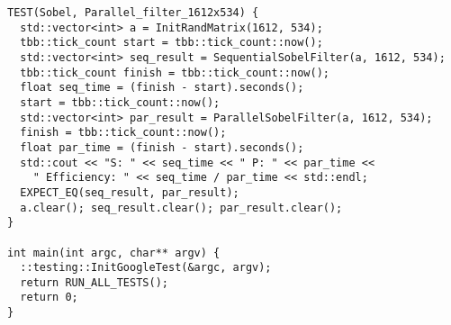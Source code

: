 \documentclass[12pt]{article}
\begin{document}
\begin{lstlisting}
TEST(Sobel, Parallel_filter_1612x534) {
  std::vector<int> a = InitRandMatrix(1612, 534);
  tbb::tick_count start = tbb::tick_count::now();
  std::vector<int> seq_result = SequentialSobelFilter(a, 1612, 534);
  tbb::tick_count finish = tbb::tick_count::now();
  float seq_time = (finish - start).seconds();
  start = tbb::tick_count::now();
  std::vector<int> par_result = ParallelSobelFilter(a, 1612, 534);
  finish = tbb::tick_count::now();
  float par_time = (finish - start).seconds();
  std::cout << "S: " << seq_time << " P: " << par_time <<
    " Efficiency: " << seq_time / par_time << std::endl;
  EXPECT_EQ(seq_result, par_result);
  a.clear(); seq_result.clear(); par_result.clear();
}

int main(int argc, char** argv) {
  ::testing::InitGoogleTest(&argc, argv);
  return RUN_ALL_TESTS();
  return 0;
}
\end{lstlisting}
\end{document}
